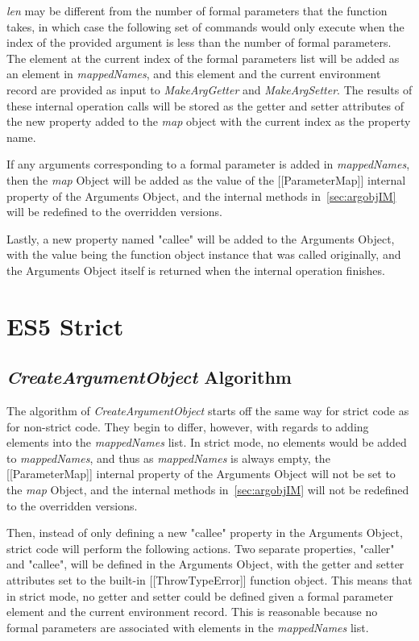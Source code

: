 \documentclass[a4paper,11pt,twoside]{report}
\begin{document}
\textit{len} may be different from the number of formal parameters that the function takes, in which case the following set of commands would only execute when the index of the provided argument is less than the number of formal parameters. The element at the current index of the formal parameters list will be added as an element in \textit{mappedNames}, and this element and the current environment record are provided as input to \textit{MakeArgGetter} and \textit{MakeArgSetter}. The results of these internal operation calls will be stored as the getter and setter attributes of the new property added to the \textit{map} object with the current index as the property name.

If any arguments corresponding to a formal parameter is added in \textit{mappedNames}, then the \textit{map} Object will be added as the value of the [[ParameterMap]] internal property of the Arguments Object, and the internal methods in~\ref{sec:argobjIM} will be redefined to the overridden versions.

Lastly, a new property named "callee" will be added to the Arguments Object, with the value being the function object instance that was called originally, and the Arguments Object itself is returned when the internal operation finishes.

\section{ES5 Strict}
\subsection{\textit{CreateArgumentObject} Algorithm}
The algorithm of \textit{CreateArgumentObject} starts off the same way for strict code as for non-strict code. They begin to differ, however, with regards to adding elements into the \textit{mappedNames} list. In strict mode, no elements would be added to \textit{mappedNames}, and thus as \textit{mappedNames} is always empty, the [[ParameterMap]] internal property of the Arguments Object will not be set to the \textit{map} Object, and the internal methods in~\ref{sec:argobjIM} will not be redefined to the overridden versions.

Then, instead of only defining a new "callee" property in the Arguments Object, strict code will perform the following actions. Two separate properties, "caller" and "callee", will be defined in the Arguments Object, with the getter and setter attributes set to the built-in [[ThrowTypeError]] function object. This means that in strict mode, no getter and setter could be defined given a formal parameter element and the current environment record. This is reasonable because no formal parameters are associated with elements in the \textit{mappedNames} list.
\end{document}
